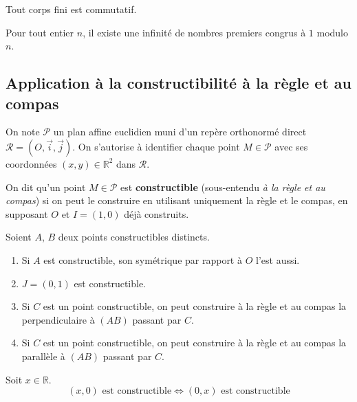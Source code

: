   \begin{application}
    Tout corps fini est commutatif.
  \end{application}


  \begin{application}
    Pour tout entier $n$, il existe une infinité de nombres premiers congrus à $1$ modulo $n$.
  \end{application}

  \subsection{Application à la constructibilité à la règle et au compas}


  On note $\mathcal{P}$ un plan affine euclidien muni d'un repère orthonormé direct $\mathcal{R} = (O, \overrightarrow{i}, \overrightarrow{j})$. On s'autorise à identifier chaque point $M \in \mathcal{P}$ avec ses coordonnées $(x,y) \in \mathbb{R}^2$ dans $\mathcal{R}$.

  \begin{definition}
    On dit qu'un point $M \in \mathcal{P}$ est \textbf{constructible} (sous-entendu \textit{à la règle et au compas}) si on peut le construire en utilisant uniquement la règle et le compas, en supposant $O$ et $I=(1,0)$ déjà construits.
  \end{definition}

  \begin{proposition}
    Soient $A$, $B$ deux points constructibles distincts.
    \begin{enumerate}[label={\bfseries(\roman*)}]
      \item Si $A$ est constructible, son symétrique par rapport à $O$ l'est aussi.
      \item $J = (0,1)$ est constructible.
      \item Si $C$ est un point constructible, on peut construire à la règle et au compas la perpendiculaire à $(AB)$ passant par $C$.
      \item Si $C$ est un point constructible, on peut construire à la règle et au compas la parallèle à $(AB)$ passant par $C$.
    \end{enumerate}
  \end{proposition}

  \begin{proposition}
    Soit $x \in \mathbb{R}$.
    \[ (x,0) \text{ est constructible} \iff (0,x) \text{ est constructible} \]
  \end{proposition}

